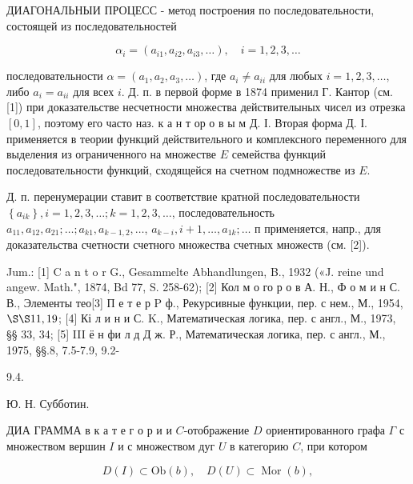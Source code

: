 \documentclass[10pt]{article}
\begin{document}
ДИАГОНАЛЬНЫИ ПРОЦЕСС - метод построения по последовательности, состоящей из последовательностей



\[

\alpha_{i}=\left(a_{i 1}, a_{i 2}, a_{i 3}, \ldots\right), \quad i=1,2,3, \ldots

\]



последовательности $\alpha=\left(a_{1}, a_{2}, a_{3}, \ldots\right)$, где $a_{i} \neq a_{i i}$ для любых $i=1,2,3, \ldots$, либо $a_{i}=a_{i i}$ для всех $i$. Д. п. в первой форме в 1874 применил Г. Кантор (см. [1]) при доказательстве несчетности множества действителыных чисел из отрезка $[0,1]$, поэтому его часто наз. к а н т ор о в ы м Д. І. Вторая форма Д. І. применяется в теории функций действительного и комплексного переменного для выделения из ограниченного на множестве $E$ семейства функций последовательности функций, сходящейся на счетном подмножестве из $E$.



Д. п. перенумерации ставит в соответствие кратной последовательности $\left\{a_{i k}\right\}, i=1,2,3, \ldots ; k=1,2,3, \ldots$, последовательность $a_{11}, a_{12}, a_{21} ; \ldots ; a_{k 1}, a_{k-1,2}, \ldots$, $a_{k-i}, i+1, \ldots, a_{1 k} ; \ldots$ п применяется, напр., для доказательства счетности счетного множества счетных множеств (см. [2]).



Jum.: [1] C a n t o r G., Gesammelte Abhandlungen, B., 1932 («J. reine und angew. Math.", 1874, Bd 77, S. 258-62); [2] Кол м о го р о в А. Н., Ф о м и н С. В., Элементы тео[3] П е т е р P ф., Рекурсивные функции, пер. с нем., М., 1954, $\S \S 11,19$; [4] Кі л и н и С. K., Математическая логика, пер. с англ., М., 1973, §§ 33, 34; [5] III ё н фи л д Д ж. Р., Математическая логика, пер. с англ., М., 1975, §§.8, 7.5-7.9, 9.2-

9.4.

Ю. Н. Субботин.



ДИА ГРАММА в к а т е г о р и и $C$-отображение $D$ ориентированного графа $\Gamma$ с множеством вершин $I$ и с множеством дуг $U$ в категорию $C$, при котором



\[

D(I) \subset \mathrm{Ob}(b), \quad D(U) \subset \operatorname{Mor}(b),

\]
\end{document}
